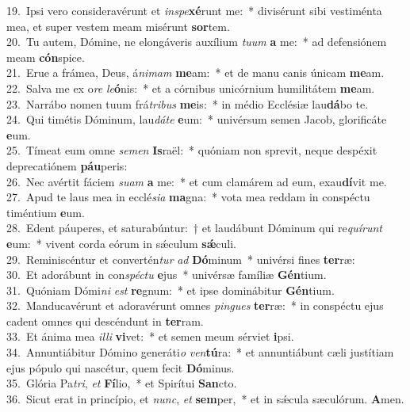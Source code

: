 {19.~}Ipsi vero consideravérunt et \textit{in}\textit{spe}\textbf{xé}runt me:~* divisérunt sibi vestiménta mea, et super vestem meam misérunt \textbf{sor}tem.\\
{20.~}Tu autem, Dómine, ne elongáveris auxílium \textit{tu}\textit{um} \textbf{a} me:~* ad defensiónem meam \textbf{cón}spice.\\
{21.~}Erue a frámea, Deus, á\textit{ni}\textit{mam} \textbf{me}am:~* et de manu canis únicam \textbf{me}am.\\
{22.~}Salva me ex o\textit{re} \textit{le}\textbf{ó}nis:~* et a córnibus unicórnium humilitátem \textbf{me}am.\\
{23.~}Narrábo nomen tuum frá\textit{tri}\textit{bus} \textbf{me}is:~* in médio Ecclésiæ lau\textbf{dá}bo te.\\
{24.~}Qui timétis Dóminum, lau\textit{dá}\textit{te} \textbf{e}um:~* univérsum semen Jacob, glorificáte \textbf{e}um.\\
{25.~}Tímeat eum omne \textit{se}\textit{men} \textbf{Is}raël:~* quóniam non sprevit, neque despéxit deprecatiónem \textbf{páu}peris:\\
{26.~}Nec avértit fáciem \textit{su}\textit{am} \textbf{a} me:~* et cum clamárem ad eum, exau\textbf{dí}vit me.\\
{27.~}Apud te laus mea in ecclé\textit{si}\textit{a} \textbf{ma}gna:~* vota mea reddam in conspéctu timéntium \textbf{e}um.\\
{28.~}Edent páuperes, et saturabúntur:~† et laudábunt Dóminum qui re\textit{quí}\textit{runt} \textbf{e}um:~* vivent corda eórum in sǽculum \textbf{sǽ}culi.\\
{29.~}Reminiscéntur et convertén\textit{tur} \textit{ad} \textbf{Dó}minum~* univérsi fines \textbf{ter}ræ:\\
{30.~}Et adorábunt in con\textit{spé}\textit{ctu} \textbf{e}jus~* univérsæ famíliæ \textbf{Gén}tium.\\
{31.~}Quóniam Dómi\textit{ni} \textit{est} \textbf{re}gnum:~* et ipse dominábitur \textbf{Gén}tium.\\
{32.~}Manducavérunt et adoravérunt omnes \textit{pin}\textit{gues} \textbf{ter}ræ:~* in conspéctu ejus cadent omnes qui descéndunt in \textbf{ter}ram.\\
{33.~}Et ánima mea \textit{il}\textit{li} \textbf{vi}vet:~* et semen meum sérviet \textbf{i}psi.\\
{34.~}Annuntiábitur Dómino generáti\textit{o} \textit{ven}\textbf{tú}ra:~* et annuntiábunt cæli justítiam ejus pópulo qui nascétur, quem fecit \textbf{Dó}minus.\\
{35.~}Glória Pa\textit{tri}, \textit{et} \textbf{Fí}lio,~* et Spirítui \textbf{San}cto.\\
{36.~}Sicut erat in princípio, et \textit{nunc}, \textit{et} \textbf{sem}per,~* et in sǽcula sæculórum. \textbf{A}men.\\
